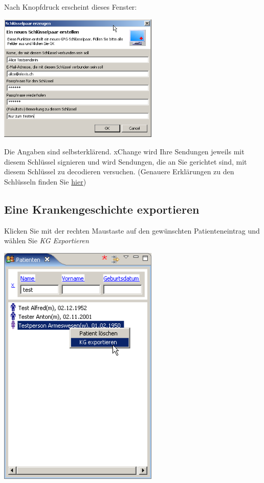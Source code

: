 Nach Knopfdruck erscheint dieses Fenster:

\includegraphics[width=3in]{images/xc2.png}

Die Angaben sind selbsterklärend. xChange wird Ihre Sendungen jeweils mit diesem Schlüssel signieren und wird Sendungen, die an Sie gerichtet sind, mit diesem Schlüssel zu decodieren versuchen.
(Genauere Erklärungen zu den Schlüsseln finden Sie \href{http://www.elexis.ch/jp/index.php?option=content&task=view&id=64}{hier})
\subsection{Eine Krankengeschichte exportieren}
Klicken Sie mit der rechten Maustaste auf den gewünschten Patienteneintrag und wählen Sie \textit{KG Exportieren}

\includegraphics[width=3in]{images/xc3.png}

